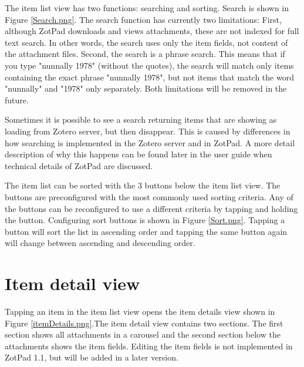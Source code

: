 \documentclass[oneside, openany, 12pt]{tufte-book}
\newcommand{\iphone}[1]{#1}
\newcommand{\ipad}[1]{}
\newcommand{\image}[2]{
	\center
	\fbox{\texttt{[image: images/iPhone/\{\#2]}}}

	\refstepcounter{figure}
	\smallskip\noindent\small Figure \thefigure: #1
	\label{#2}
	}
\newcommand{\iphone}[1]{}
\newcommand{\ipad}[1]{#1}
\newcommand{\image}[2]{
	\caption{#1}
	\label{#2}
	\fbox{\texttt{[image: images/iPad/\{\#2]}}}
	}
\begin{document}
The item list view has two functions: searching and sorting. Search is shown in Figure \ref{Search.png}. The search function has currently two limitations: First, although ZotPad downloads and views attachments, these are not indexed for full text search. In other words, the search uses only the item fields, not content of the attachment files. Second, the search is a phrase search. This means that if you type "nunnally 1978" (without the quotes), the search will match only items containing the exact phrase "nunnally 1978", but not items that match the word "nunnally" and "1978" only separately. Both limitations will be removed in the future.

Sometimes it is possible to see a search returning items that are showing as loading from Zotero server, but then disappear. This is caused by differences in how searching is implemented in the Zotero server and in ZotPad. A more detail description of why this happens can be found later in the user guide when technical details of ZotPad are discussed. 

\begin{figure}
\image{Configuring sort buttons}{Sort.png}
\end{figure}

The item list can be sorted with the \ipad{6}\iphone{3} buttons below the item list view. The \ipad{first four} buttons are preconfigured with the most commonly used sorting criteria. Any of the buttons can be reconfigured to use a different criteria by tapping and holding the button. Configuring sort buttons is shown in Figure \ref{Sort.png}. Tapping a button will sort the list in ascending order and tapping the same button again will change between ascending and descending order. 

\FloatBarrier

	\section{Item detail view}

Tapping an item in the item list view opens the item details view shown in Figure \ref{itemDetails.png}.\ipad{Opening the item detail view will push the item list into the navigator to allow quickly switching between items.

}The item detail view contains two sections. The first section shows all attachments in a carousel and the second section below the attachments shows the item fields. Editing the item fields is not implemented in ZotPad 1.1, but will be added in a later version.
\end{document}
